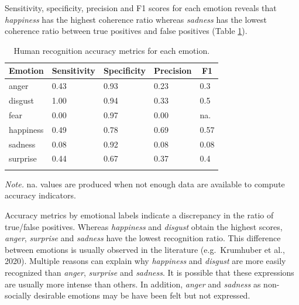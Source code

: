 \documentclass[
  english,
  doc]{apa7}
\begin{document}
Sensitivity, specificity, precision and F1 scores for each emotion reveals that \emph{happiness} has the highest coherence ratio whereas \emph{sadness} has the lowest coherence ratio between true positives and false positives (Table \ref{tab:confusionTable-sr-hr}).

\begin{table}[tbp]

\begin{center}
\begin{threeparttable}

\caption{\label{tab:confusionTable-sr-hr}Human recognition accuracy metrics for each emotion.}

\begin{tabular}{lllll}
\toprule
Emotion & \multicolumn{1}{c}{Sensitivity} & \multicolumn{1}{c}{Specificity} & \multicolumn{1}{c}{Precision} & \multicolumn{1}{c}{F1}\\
\midrule
anger & 0.43 & 0.93 & 0.23 & 0.3\\
disgust & 1.00 & 0.94 & 0.33 & 0.5\\
fear & 0.00 & 0.97 & 0.00 & na.\\
happiness & 0.49 & 0.78 & 0.69 & 0.57\\
sadness & 0.08 & 0.92 & 0.08 & 0.08\\
surprise & 0.44 & 0.67 & 0.37 & 0.4\\
\bottomrule
\addlinespace
\end{tabular}

\begin{tablenotes}[para]
\normalsize{\textit{Note.} na. values are produced when not enough data are available to compute accuracy indicators.}
\end{tablenotes}

\end{threeparttable}
\end{center}

\end{table}

Accuracy metrics by emotional labels indicate a discrepancy in the ratio of true/false positives. Whereas \emph{happiness} and \emph{disgust} obtain the highest scores, \emph{anger}, \emph{surprise} and \emph{sadness} have the lowest recognition ratio. This difference between emotions is usually observed in the literature (e.g.~Krumhuber et al., 2020). Multiple reasons can explain why \emph{happiness} and \emph{disgust} are more easily recognized than \emph{anger}, \emph{surprise} and \emph{sadness}. It is possible that these expressions are usually more intense than others. In addition, \emph{anger} and \emph{sadness} as non-socially desirable emotions may be have been felt but not expressed.
\end{document}
